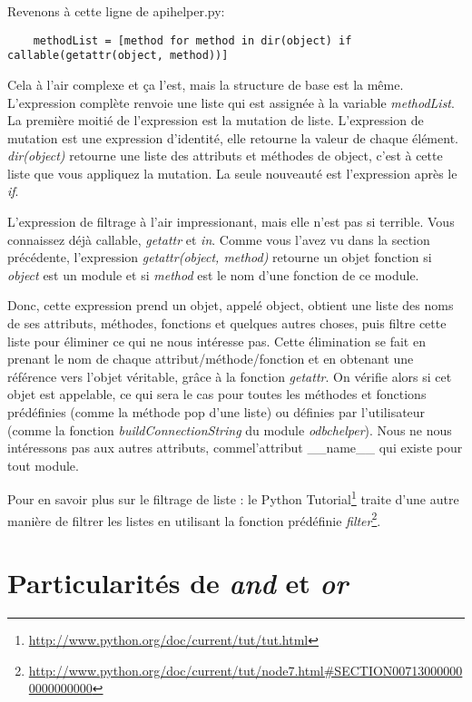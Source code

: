 Revenons à cette ligne de apihelper.py:
\begin{lstlisting}
    methodList = [method for method in dir(object) if callable(getattr(object, method))]
\end{lstlisting}

Cela à l’air complexe et ça l’est, mais la structure de base est la même. L’expression complète renvoie une liste qui est assignée à la variable \emph{methodList}. La première moitié de l’expression est la mutation de liste. L’expression de mutation est une expression d’identité, elle retourne la valeur de chaque élément. \emph{dir(object)}  retourne une liste des attributs et méthodes de object, c’est à cette liste que vous appliquez la mutation. La seule nouveauté est l’expression après le \emph{if}.

L’expression de filtrage à l’air impressionant, mais elle n’est pas si terrible. Vous connaissez déjà callable, \emph{getattr} et \emph{in}. Comme vous l’avez vu dans la section précédente, l’expression \emph{getattr(object, method)} retourne un objet fonction si \emph{object} est un module et si \emph{method} est le nom d’une fonction de ce module.

Donc, cette expression prend un objet, appelé object, obtient une liste des noms de ses attributs, méthodes, fonctions et quelques autres choses, puis filtre cette  liste pour éliminer ce qui ne nous intéresse pas. Cette élimination se fait en prenant le nom de chaque attribut/méthode/fonction et en obtenant une référence vers l’objet véritable, grâce à la fonction \emph{getattr}. On vérifie alors si cet objet est appelable, ce qui sera le cas pour toutes les méthodes et fonctions prédéfinies (comme la méthode pop d’une liste) ou définies par l’utilisateur (comme la fonction \emph{buildConnectionString} du module \emph{odbchelper}). Nous ne nous intéressons pas aux autres attributs, commel’attribut \_\_name\_\_ qui existe pour tout module.

\medskip
\noindent Pour en savoir plus sur le filtrage de liste : le Python Tutorial\footnote{\url{http://www.python.org/doc/current/tut/tut.html}} traite d’une autre manière de filtrer les listes en utilisant la fonction prédéfinie \emph{filter}\footnote{\url{http://www.python.org/doc/current/tut/node7.html\#SECTION007130000000000000000}}.

\section{Particularités de \emph{and} et \emph{or}}

